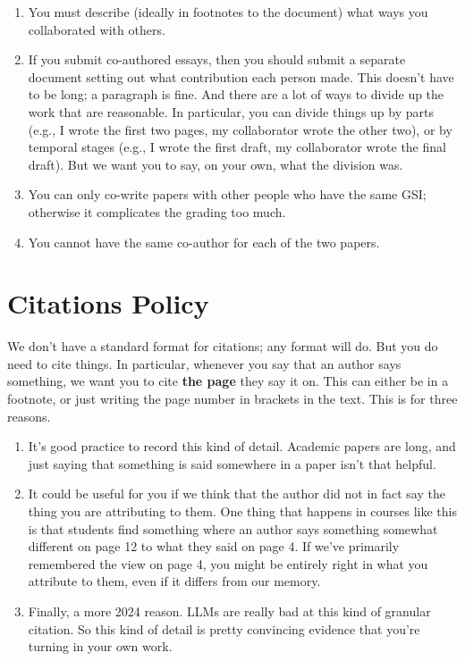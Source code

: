 \documentclass[
  12pt,
  letterpaper,
  DIV=11,
  numbers=noendperiod]{scrartcl}
\providecommand{\tightlist}{%
  \setlength{\itemsep}{0pt}\setlength{\parskip}{0pt}}\usepackage{longtable,booktabs,array}
\begin{document}
\begin{enumerate}
\def\labelenumi{\arabic{enumi}.}
\tightlist
\item
  You must describe (ideally in footnotes to the document) what ways you
  collaborated with others.
\item
  If you submit co-authored essays, then you should submit a separate
  document setting out what contribution each person made. This doesn't
  have to be long; a paragraph is fine. And there are a lot of ways to
  divide up the work that are reasonable. In particular, you can divide
  things up by parts (e.g., I wrote the first two pages, my collaborator
  wrote the other two), or by temporal stages (e.g., I wrote the first
  draft, my collaborator wrote the final draft). But we want you to say,
  on your own, what the division was.
\item
  You can only co-write papers with other people who have the same GSI;
  otherwise it complicates the grading too much.
\item
  You cannot have the same co-author for each of the two papers.
\end{enumerate}

\section{Citations Policy}\label{citations-policy}

We don't have a standard format for citations; any format will do. But
you do need to cite things. In particular, whenever you say that an
author says something, we want you to cite \textbf{the page} they say it
on. This can either be in a footnote, or just writing the page number in
brackets in the text. This is for three reasons.

\begin{enumerate}
\def\labelenumi{\arabic{enumi}.}
\tightlist
\item
  It's good practice to record this kind of detail. Academic papers are
  long, and just saying that something is said somewhere in a paper
  isn't that helpful.
\item
  It could be useful for you if we think that the author did not in fact
  say the thing you are attributing to them. One thing that happens in
  courses like this is that students find something where an author says
  something somewhat different on page 12 to what they said on page 4.
  If we've primarily remembered the view on page 4, you might be
  entirely right in what you attribute to them, even if it differs from
  our memory.
\item
  Finally, a more 2024 reason. LLMs are really bad at this kind of
  granular citation. So this kind of detail is pretty convincing
  evidence that you're turning in your own work.
\end{enumerate}
\end{document}
